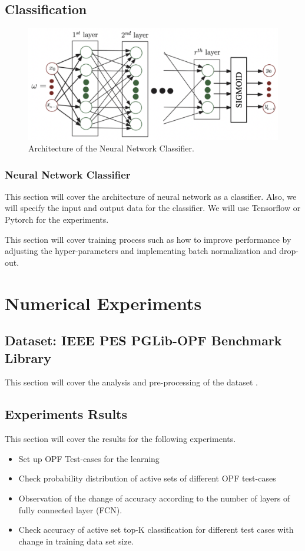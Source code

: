\documentclass[11pt]{article}
\begin{document}
\subsection{Classification}
\begin{figure}[h]\label{fig:nns_arch}
\centering
\includegraphics[scale=0.31]{report/figure/NNs_arch.png}
\caption{Architecture of the Neural Network Classifier.}
\end{figure}
\subsubsection{Neural Network Classifier}


This section will cover the architecture of neural network as a classifier. Also, we will specify the input and output data for the classifier. We will use Tensorflow or Pytorch for the experiments. 

This section will cover training process such as how to improve performance by adjusting the hyper-parameters and implementing batch normalization and drop-out.



\section{Numerical Experiments}\label{sec:tests}
\subsection{Dataset:  IEEE PES PGLib-OPF Benchmark Library}
This section will cover the analysis and pre-processing of the dataset \cite{pglib-opf}. 

\subsection{Experiments Rsults}
This section will cover the results for the following experiments.
\begin{itemize}
  \item Set up OPF Test-cases for the learning
  \item Check probability distribution of active sets of different OPF test-cases
  \item Observation of the change of accuracy according to the number of layers of fully connected layer (FCN).
  \item Check accuracy of active set top-K classification for different test cases with change in training data set size.
\end{itemize}
\end{document}
